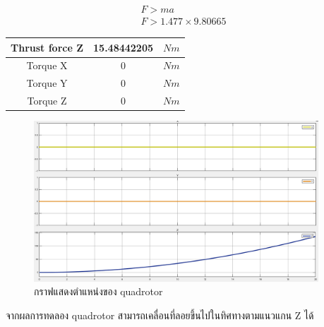\begin{equation}
    \begin{array}{c}
    {F > ma}\\
    {F > 1.477 \times 9.80665}
    \label{equ:newton_law}
    \end{array}
\end{equation}
\begin{center}
    \begin{tabular}{ | c | c | c | } 
    \hline
    Thrust force Z & 15.48442205 & $Nm$ \\ 
    \hline
    Torque X & 0 & $Nm$ \\ 
    \hline
    Torque Y & 0 & $Nm$ \\ 
    \hline
    Torque Z & 0 & $Nm$ \\ 
    \hline
    \end{tabular}
\end{center}
\begin{figure}[!ht]
	\centering
	\includegraphics[width=0.95\textwidth]{images/simulink/test_climbup.png}
	\caption{กราฟแสดงตำแหน่งของ quadrotor}
\end{figure}

จากผลการทดลอง quadrotor สามารถเคลื่อนที่ลอยขึ้นไปในทิศทางตามแนวแกน Z ได้
